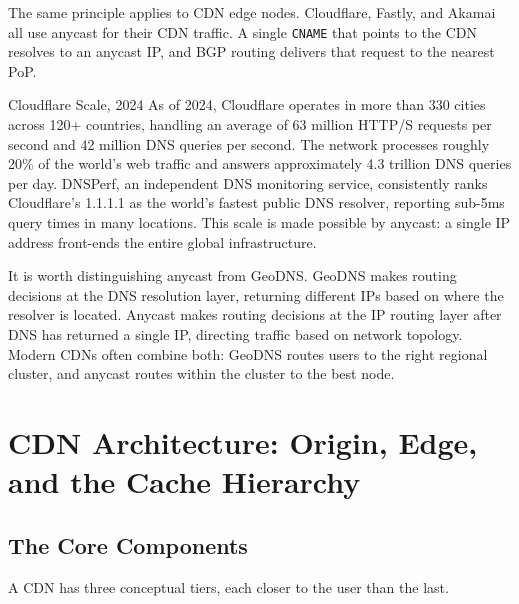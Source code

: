\documentclass[11pt,a4paper]{article}
\begin{document}
The same principle applies to CDN edge nodes. Cloudflare, Fastly, and Akamai all use anycast for their CDN traffic. A single \texttt{CNAME} that points to the CDN resolves to an anycast IP, and BGP routing delivers that request to the nearest PoP.

\begin{industrybox}{Cloudflare Scale, 2024}
As of 2024, Cloudflare operates in more than 330 cities across 120+ countries, handling an average of 63 million HTTP/S requests per second and 42 million DNS queries per second. The network processes roughly 20\% of the world's web traffic and answers approximately 4.3 trillion DNS queries per day. DNSPerf, an independent DNS monitoring service, consistently ranks Cloudflare's 1.1.1.1 as the world's fastest public DNS resolver, reporting sub-5ms query times in many locations. This scale is made possible by anycast: a single IP address front-ends the entire global infrastructure.
\end{industrybox}

It is worth distinguishing anycast from GeoDNS. GeoDNS makes routing decisions at the DNS resolution layer, returning different IPs based on where the resolver is located. Anycast makes routing decisions at the IP routing layer after DNS has returned a single IP, directing traffic based on network topology. Modern CDNs often combine both: GeoDNS routes users to the right regional cluster, and anycast routes within the cluster to the best node.

\section{CDN Architecture: Origin, Edge, and the Cache Hierarchy}

\subsection{The Core Components}

A CDN has three conceptual tiers, each closer to the user than the last.
\end{document}
